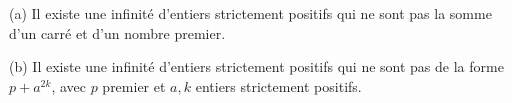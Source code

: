 (a) Il existe une infinité d'entiers strictement positifs qui ne sont pas la somme d'un carré et d'un nombre premier.

(b) Il existe une infinité d'entiers strictement positifs qui ne sont pas de la forme $p + a^{2k}$, avec $p$ premier et $a, k$ entiers strictement positifs.
